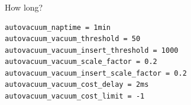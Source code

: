 \documentclass[usenames,dvipsnames, 18pt, compress, aspectratio=169]{beamer}
\begin{document}





\begin{frame}[fragile]{}
    \frametitle{}
    \begin{center}
        How long?

        \begin{verbatim}
autovacuum_naptime = 1min
autovacuum_vacuum_threshold = 50
autovacuum_vacuum_insert_threshold = 1000
autovacuum_vacuum_scale_factor = 0.2
autovacuum_vacuum_insert_scale_factor = 0.2
autovacuum_vacuum_cost_delay = 2ms
autovacuum_vacuum_cost_limit = -1
        \end{verbatim}

    \end{center}
\end{frame}
\end{document}
